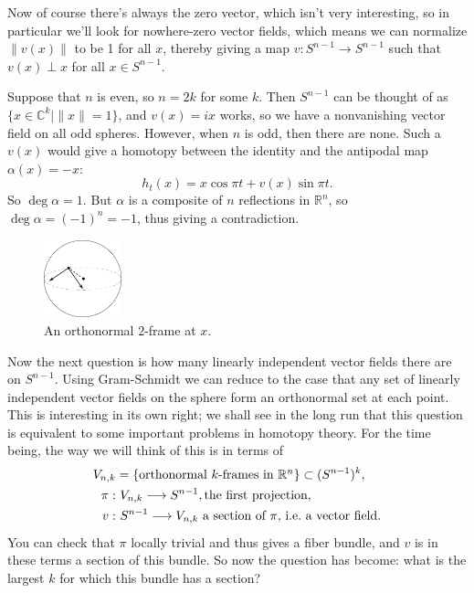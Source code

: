 \documentclass{article}
\newcommand{\C}{\mathbb{C}}
\newcommand{\R}{\mathbb{R}}
\renewcommand{\to}{\longrightarrow}
\theoremstyle{definition}
\begin{document}
Now of course there's always the zero vector, which isn't very interesting, so in particular we'll look for nowhere-zero vector fields, which means we can normalize $\|v(x)\|$ to be 1 for all $x$, thereby giving a map $v: S^{n-1} \to S^{n-1}$ such that $v(x) \perp x$ for all $x \in S^{n-1}$. %

Suppose that $n$ is even, so $n = 2k$ for some $k$.  Then $S^{n-1}$ can be thought of as $\{x \in \C^k \mid \|x\| = 1\}$, and $v(x) = ix$ works, so we have a nonvanishing vector field on all odd spheres.  However, when $n$ is odd, then there are none.  Such a $v(x)$ would give a homotopy between the identity and the antipodal map $\alpha(x) = -x$: \[h_t(x) = x \cos \pi t + v(x) \sin \pi t.\]  So $\deg \alpha = 1$.  But $\alpha$ is a composite of $n$ reflections in $\R^n$, so $\deg \alpha = (-1)^n = -1$, thus giving a contradiction.

\begin{figure}
\centering\includegraphics[width=0.2\textwidth]{figures/fig2.pdf}
\caption{\small An orthonormal $2$-frame at $x$.}
\end{figure}
Now the next question is how many linearly independent vector fields there are on $S^{n-1}$.  Using Gram-Schmidt we can reduce to the case that any set of linearly independent vector fields on the sphere form an orthonormal set at each point.  This is interesting in its own right; we shall see in the long run that this question is equivalent to some important problems in homotopy theory.  For the time being, the way we will think of this is in terms of
\begin{align*}
V_{n, k} & = \{\hbox{orthonormal $k$-frames in $\R^n$}\} \subset (S^{n-1})^k, \\
\pi: &\,\, V_{n, k} \to S^{n-1}, \hbox{the first projection}, \\
v: &\,\, S^{n-1} \to V_{n, k}\hbox{ a section of $\pi$, i.e.\ a vector field}.
\end{align*}
You can check that $\pi$ locally trivial and thus gives a fiber bundle, and $v$ is in these terms a section of this bundle.  So now the question has become: what is the largest $k$ for which this bundle has a section?
\end{document}
